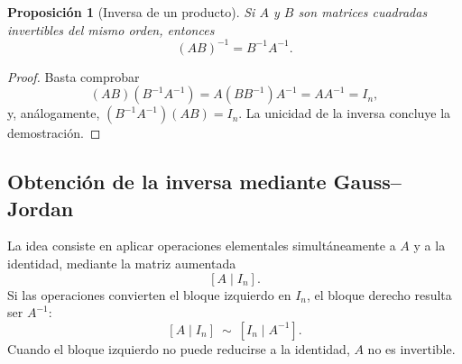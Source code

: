 \documentclass[12pt]{article}
\newtheorem{proposicion}[definicion]{Proposición}
\theoremstyle{remark}
\begin{document}
\begin{proposicion}[Inversa de un producto]
Si $A$ y $B$ son matrices cuadradas invertibles del mismo orden, entonces
\[
\boxed{(AB)^{-1}=B^{-1}A^{-1}.}
\]
\end{proposicion}
\begin{proof}
Basta comprobar
\[
(AB)(B^{-1}A^{-1})=A(BB^{-1})A^{-1}=AA^{-1}=I_n,
\]
y, análogamente, $(B^{-1}A^{-1})(AB)=I_n$. La unicidad de la inversa concluye la demostración.
\end{proof}

\subsection{Obtención de la inversa mediante Gauss--Jordan}
La idea consiste en aplicar operaciones elementales simultáneamente a $A$ y a la identidad, mediante la matriz aumentada
\[
\left[A\mid I_n\right].
\]
Si las operaciones convierten el bloque izquierdo en $I_n$, el bloque derecho resulta ser $A^{-1}$:
\[
\boxed{[A\mid I_n]\ \sim\ [I_n\mid A^{-1}].}
\]
Cuando el bloque izquierdo no puede reducirse a la identidad, $A$ no es invertible.
\end{document}
